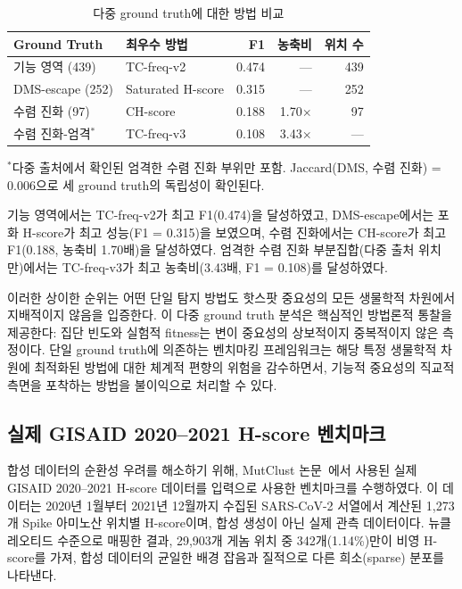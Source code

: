 \begin{table}[htbp]
\centering
\caption{다중 ground truth에 대한 방법 비교}
\label{tab:multi_gt}
\begin{tabular}{llrrr}
\toprule
\textbf{Ground Truth} & \textbf{최우수 방법} & \textbf{F1} & \textbf{농축비} & \textbf{위치 수} \\
\midrule
기능 영역 (439) & TC-freq-v2 & 0.474 & --- & 439 \\
DMS-escape (252) & Saturated H-score & 0.315 & --- & 252 \\
수렴 진화 (97) & CH-score & 0.188 & 1.70$\times$ & 97 \\
수렴 진화-엄격$^*$ & TC-freq-v3 & 0.108 & 3.43$\times$ & --- \\
\bottomrule
\end{tabular}
\begin{minipage}{\textwidth}
\smallskip
\footnotesize $^*$다중 출처에서 확인된 엄격한 수렴 진화 부위만 포함. Jaccard(DMS, 수렴 진화) = 0.006으로 세 ground truth의 독립성이 확인된다.
\end{minipage}
\end{table}

기능 영역에서는 TC-freq-v2가 최고 F1(0.474)을 달성하였고, DMS-escape에서는 포화 H-score가 최고 성능(F1 = 0.315)을 보였으며, 수렴 진화에서는 CH-score가 최고 F1(0.188, 농축비 1.70배)을 달성하였다.
엄격한 수렴 진화 부분집합(다중 출처 위치만)에서는 TC-freq-v3가 최고 농축비(3.43배, F1 = 0.108)를 달성하였다.

이러한 상이한 순위는 어떤 단일 탐지 방법도 핫스팟 중요성의 모든 생물학적 차원에서 지배적이지 않음을 입증한다.
이 다중 ground truth 분석은 핵심적인 방법론적 통찰을 제공한다: 집단 빈도와 실험적 fitness는 변이 중요성의 상보적이지 중복적이지 않은 측정이다.
단일 ground truth에 의존하는 벤치마킹 프레임워크는 해당 특정 생물학적 차원에 최적화된 방법에 대한 체계적 편향의 위험을 감수하면서, 기능적 중요성의 직교적 측면을 포착하는 방법을 불이익으로 처리할 수 있다.


\subsection{실제 GISAID 2020--2021 H-score 벤치마크}
\label{sec:real_gisaid_benchmark}


합성 데이터의 순환성 우려를 해소하기 위해, MutClust 논문~\cite{youn2025mutclust}에서 사용된 실제 GISAID 2020--2021 H-score 데이터를 입력으로 사용한 벤치마크를 수행하였다.
이 데이터는 2020년 1월부터 2021년 12월까지 수집된 SARS-CoV-2 서열에서 계산된 1,273개 Spike 아미노산 위치별 H-score이며, 합성 생성이 아닌 실제 관측 데이터이다.
뉴클레오티드 수준으로 매핑한 결과, 29,903개 게놈 위치 중 342개(1.14\%)만이 비영 H-score를 가져, 합성 데이터의 균일한 배경 잡음과 질적으로 다른 희소(sparse) 분포를 나타낸다.

